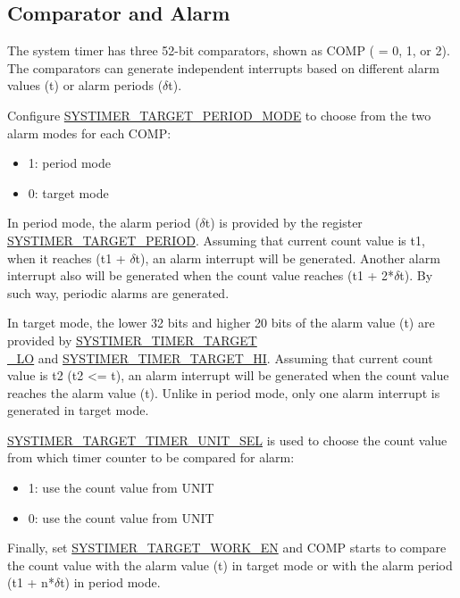 \documentclass[main\_\_EN.tex]{subfiles}
\begin{document}
\subsection{Comparator and Alarm}
The system timer has three 52-bit comparators, shown as COMP ( = 0, 1, or 2). The comparators can generate independent interrupts based on different alarm values (t) or alarm periods ($\delta$t).

Configure \hyperref[fielddesc:SYSTIMERTARGET0PERIODMODE]{SYSTIMER\_TARGET\_PERIOD\_MODE} to choose from the two alarm modes for each COMP:
\begin{itemize}
    \item 1: period mode
    \item 0: target mode
\end{itemize}

In period mode, the alarm period ($\delta$t) is provided by the register \hyperref[fielddesc:SYSTIMERTARGET2PERIOD]{SYSTIMER\_TARGET\_PERIOD}. Assuming that current count value is t1, when it reaches (t1 + $\delta$t), an alarm interrupt will be generated. Another alarm interrupt also will be generated when the count value reaches (t1 + 2*$\delta$t). By such way, periodic alarms are generated.

In target mode, the lower 32 bits and higher 20 bits of the alarm value (t) are provided by  \hyperref[fielddesc:SYSTIMERTIMERTARGET0LO]{SYSTIMER\_TIMER\_TARGET\\\_LO} and \hyperref[fielddesc:SYSTIMERTIMERTARGET0HI]{SYSTIMER\_TIMER\_TARGET\_HI}. Assuming that current count value is t2 (t2 <= t), an alarm interrupt will be generated when the count value reaches the alarm value (t). Unlike in period mode, only one alarm interrupt is generated in target mode.

\hyperref[fielddesc:SYSTIMERTARGET0TIMERUNITSEL]{SYSTIMER\_TARGET\_TIMER\_UNIT\_SEL} is used to choose the count value from which timer counter to be compared for alarm:

\begin{itemize}
        \item 1: use the count value from UNIT
        \item 0: use the count value from UNIT
\end{itemize}

Finally, set \hyperref[fielddesc:SYSTIMERTARGET0WORKEN]{SYSTIMER\_TARGET\_WORK\_EN} and COMP starts to compare the count value with the alarm value (t) in target mode or with the alarm period (t1 + n*$\delta$t) in period mode.
\end{document}
